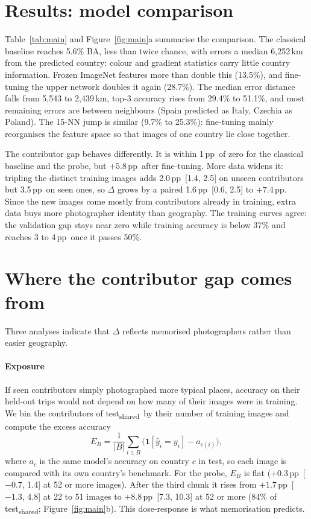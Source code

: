 \documentclass[9pt]{extarticle}
\newcommand{\tsh}{test\textsubscript{shared}}
\newcommand{\pp}{\,pp}
\begin{document}
\section{Results: model comparison}
\label{sec:results}
Table~\ref{tab:main} and Figure~\ref{fig:main}a summarise the comparison. The classical
baseline reaches 5.6\% BA, less than twice chance, with errors a median 6{,}252\,km from the
predicted country: colour and gradient statistics carry little country information. Frozen
ImageNet features more than double this (13.5\%), and fine-tuning the upper network doubles
it again (28.7\%). The median error distance falls from 5{,}543 to 2{,}439\,km, top-3
accuracy rises from 29.4\% to 51.1\%, and most remaining errors are between neighbours
(Spain predicted as Italy, Czechia as Poland). The 15-NN jump is similar (9.7\% to
25.3\%): fine-tuning mainly reorganises the feature space so that images of one country lie
close together.

The contributor gap behaves differently. It is within 1\pp\ of zero for the classical
baseline and the probe, but $+5.8$\pp\ after fine-tuning. More data widens it: tripling the
distinct training images adds 2.0\pp\ [1.4, 2.5] on unseen contributors but 3.5\pp\ on seen
ones, so $\Delta$ grows by a paired 1.6\pp\ [0.6, 2.5] to $+7.4$\pp. Since the new images
come mostly from contributors already in training, extra data buys more photographer
identity than geography. The training curves agree: the validation gap stays near zero while
training accuracy is below 37\% and reaches 3 to 4\pp\ once it passes 50\%.

\section{Where the contributor gap comes from}
\label{sec:shortcut}
Three analyses indicate that $\Delta$ reflects memorised photographers rather than easier
geography.

\paragraph{Exposure} If seen contributors simply photographed more typical places, accuracy
on their held-out trips would not depend on how many of their images were in training.
We bin the contributors of \tsh\ by their number of training images and compute the excess
accuracy
\[
E_B=\frac1{|B|}\sum_{i\in B}\big(\mathbf{1}[\hat y_i=y_i]-a_{c(i)}\big),
\]
where $a_c$ is the same model's accuracy on country $c$ in test, so each image is compared
with its own country's benchmark. For the probe, $E_B$ is flat ($+0.3$\pp\ [$-0.7$, 1.4] at
52 or more images). After the third chunk it rises from $+1.7$\pp\ [$-1.3$, 4.8] at 22 to 51
images to $+8.8$\pp\ [7.3, 10.3] at 52 or more (84\% of \tsh; Figure~\ref{fig:main}b).
This dose-response is what memorisation predicts.
\end{document}
